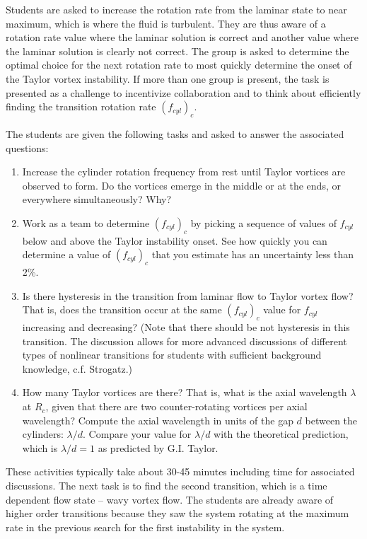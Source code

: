 \documentclass[%
reprint,
 amsmath,amssymb,
 aps,
prb,
floatfix,
longbibliography,
notitlepage
]{revtex4-1}
\begin{document}
Students are asked to increase the rotation rate from the laminar state to near maximum, which is where the fluid is turbulent. They are thus aware of a rotation rate value where the laminar solution is correct and another value where the laminar solution is clearly not correct. The group is asked to determine the optimal choice for the next rotation rate to most quickly determine the onset of the Taylor vortex instability. If more than one group is present, the task is presented as a challenge to incentivize  collaboration and to think about efficiently finding the transition rotation rate $(f_{cyl})_c$.

The students are given the following tasks and asked to answer the associated questions:
\begin{enumerate}
\item  Increase the cylinder rotation frequency from rest until Taylor vortices are observed to form.  Do the vortices emerge in the middle or at the ends, or everywhere simultaneously? Why? 
\item  Work as a team to determine $(f_{cyl})_c$ by picking a sequence of values of 
$f_{cyl}$ below and above the Taylor instability onset.  See how quickly you can determine a value of $(f_{cyl})_c$ that you estimate has an uncertainty less than 2\%. 
\item Is there hysteresis in the transition from laminar flow to Taylor vortex flow? That is, does the transition occur at the same  $(f_{cyl})_c$ value for $f_{cyl}$ increasing and decreasing? (Note that there should be not hysteresis in this transition. The discussion allows for more advanced discussions of different types of nonlinear transitions for students with sufficient background knowledge, c.f. Strogatz.\cite{strogatz})
\item  How many Taylor vortices are there? That is, what is the axial wavelength $\lambda$ at  $R_c$, given that there are two counter-rotating vortices per axial wavelength?  Compute the axial wavelength in units of the gap $d$ between the cylinders:  $\lambda/d$. Compare your value for $\lambda/d$ with the theoretical prediction, which is $\lambda/d=1$ as predicted by G.I. Taylor.\cite{taylor}
\end{enumerate}

These activities typically take about 30-45 minutes including time for associated discussions. The next task is to find the second transition, which is a time dependent flow state -- wavy vortex flow. The students are already aware of higher order transitions because they saw the system rotating at the maximum rate in the previous search for the first instability in the system.   
\end{document}
